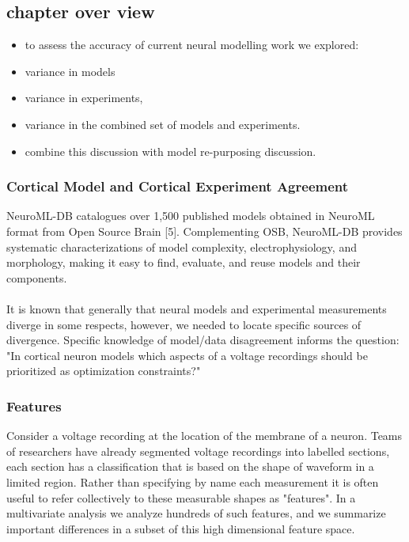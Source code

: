 
\subsection{chapter over view}
\begin{itemize}
\item to assess the accuracy of current neural modelling work we explored:
\item variance in models
\item variance in experiments,  
\item variance in the combined set of models and experiments.
\item combine this discussion with model re-purposing discussion.

\end{itemize}




\subsubsection{Cortical Model and Cortical Experiment Agreement}

NeuroML-DB \cite{birgiolas2016rapid} catalogues over 1,500 published models obtained in NeuroML format from Open Source Brain [5]. Complementing OSB, NeuroML-DB provides systematic characterizations of model complexity, electrophysiology, and morphology, making it easy to find, evaluate, and reuse models and their components.\\
\\
It is known that generally that neural models and experimental measurements diverge in some respects,  however, we needed to locate specific sources of divergence. Specific knowledge of model/data disagreement informs the question: "In  cortical neuron models which aspects of a voltage recordings should be prioritized as optimization constraints?"

\subsubsection{Features} Consider a voltage recording at the location of the membrane of a neuron. Teams of researchers have already segmented voltage recordings into labelled sections, each section has a classification that is based on the shape of waveform in a limited region. Rather than specifying by name each measurement it is often useful to refer collectively to these measurable shapes as "features". In a multivariate analysis we analyze hundreds of such features, and we summarize important differences in a subset of this high dimensional feature space. 

